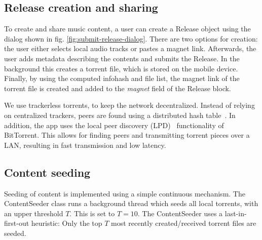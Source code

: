 \subsection{Release creation and sharing}
\label{sec:torrent-creation}
To create and share music content, a user can create a Release object using the dialog shown in fig. \ref{fig:submit-release-dialog}.  There are two options for creation: the user either selects local audio tracks or pastes a magnet link. Afterwards, the user adds metadata describing the contents and submits the Release. In the background this creates a torrent file, which is stored on the mobile device. Finally, by using the computed infohash and file list, the magnet link of the torrent file is created and added to the \textit{magnet} field of the Release block.

We use trackerless torrents, to keep the network decentralized. Instead of relying on centralized trackers, peers are found using a distributed hash table~\citep{dht2019}. In addition, the app uses the local peer discovery (LPD)~\citep{bittorrentbep142015} functionality of BitTorrent. This allows for finding peers and transmitting torrent pieces over a LAN, resulting in fast transmission and low latency.
\subsection{Content seeding}
\label{sec:content-seeding}
Seeding of content is implemented using a simple continuous mechanism. The ContentSeeder class runs a background thread which seeds all local torrents, with an upper threshold \(T\). This is set to \(T=10\). The ContentSeeder uses a last-in-first-out heuristic: Only the top \(T\) most recently created/received torrent files are seeded.

